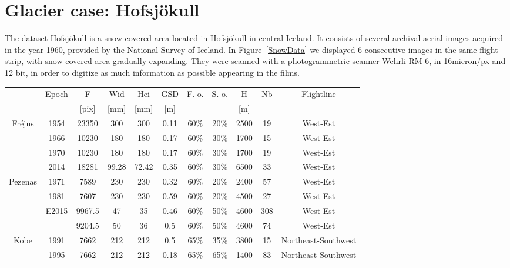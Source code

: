 \section{Glacier case: Hofsjökull}
The dataset Hofsjökull is a snow-covered area located in Hofsjökull in central Iceland. It consists of several archival aerial images acquired in the year 1960, provided by the National Survey of Iceland. In Figure~\ref{SnowData} we displayed 6 consecutive images in the same flight strip, with snow-covered area gradually expanding. They were scanned with a photogrammetric scanner Wehrli RM-6, in 16micron/px and 12 bit, in order to digitize as much information as possible appearing in the films.

\begin{table}[htbp]
	\scriptsize %
	\centering
	\begin{tabular}{||c|c||c|c|c|c|c|c|c|c|c||}\hline
& \multirow{2}{*}{Epoch} & F & Wid & Hei & GSD & \multirow{2}{*}{F. o.} & \multirow{2}{*}{S. o.} & H & \multirow{2}{*}{Nb} & \multirow{2}{*}{Flightline} \\
&  & [pix] & [mm] & [mm] & [m] & & & [m] & & \\\hline\hline

\multirow{4}{*}{Fr{\'e}jus} & 1954 & 23350 & 300 & 300 & \color{black}0.11 & 60\% & 20\% & 2500 & 19 & West-Est \\
& 1966 & 10230 & 180 & 180 & \color{black}0.17 & 60\% & 30\% & 1700 & 15& West-Est \\
& 1970 & 10230 & 180 & 180 & 0.17 & 60\% & 30\% & 1700 & 19& West-Est \\
& 2014 & \color{black}18281 & 99.28 & 72.42 & 0.35 & 60\% & 30\% & 6500 & 33& West-Est \\\hline\hline

\multirow{4}{*}{Pezenas} & 1971 & 7589 & 230 & 230 & 0.32 &    60\% &    20\% & 2400 & 57& West-Est \\
& 1981 & 7607 & 230 & 230 & 0.59 & 60\% & 20\% & 4500 & 27& West-Est \\
& \multirow{2}{*}{E2015} & 9967.5 & 47 & 35 & 0.46 & 60\% & 50\% & 4600 & 308& West-Est \\
&  & 9204.5 & 50 & 36 & 0.5 & 60\% & 50\% & 4600 & 74& West-Est \\\hline\hline

\multirow{2}{*}{Kobe}& 1991& 7662 & 212 & 212 & 0.5 &    65\% &    35\% & 3800 & 15 & Northeast-Southwest \\
& 1995& 7662 & 212 & 212 & 0.18 & 65\% & 65\% & 1400 & 83& Northeast-Southwest \\\hline\hline


\end{tabular}
\end{table}

